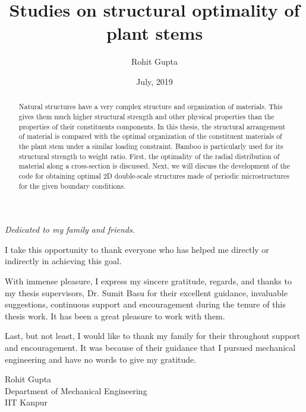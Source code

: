 \documentclass[openright,twoside]{iitkthesis}
\begin{document}

\title{Studies on structural optimality of plant stems}
\author{Rohit Gupta}
\date{July, 2019}


\thesis
{}

\maketitle

\makecertificate

\begin{dedication}
\textit{Dedicated to my family and friends.} 
\end{dedication}

\begin{abstract}
Natural structures have a very complex structure and organization of materials. This gives them much higher structural strength and other physical properties than the properties of their constituents components. In this thesis, the structural arrangement of material is compared with the optimal organization of the constituent materials of the plant stem under a similar loading constraint. Bamboo is particularly used for its structural strength to weight ratio. First, the optimality of the radial distribution of material along a cross-section is discussed. Next, we will discuss the development of the code for obtaining optimal 2D double-scale structures made of periodic microstructures for the given boundary conditions.
\end{abstract}

\begin{acknowledgments}

I take this opportunity to thank everyone who has helped me directly or indirectly in achieving this goal. 

With immense pleasure, I express my sincere gratitude, regards, and thanks to my thesis supervisors, Dr. Sumit Basu for their excellent guidance, invaluable suggestions, continuous support and encouragement during the tenure of this thesis work. It has been a great pleasure to work with them. 

Last, but not least, I would like to thank my family for their throughout support and encouragement. It was because of their guidance that I pursued mechanical engineering and have no words to give my gratitude. 

\begin{flushright}
Rohit Gupta
\\Department of Mechanical Engineering
\\IIT Kanpur
\end{flushright}

\end{acknowledgments}
\end{document}
